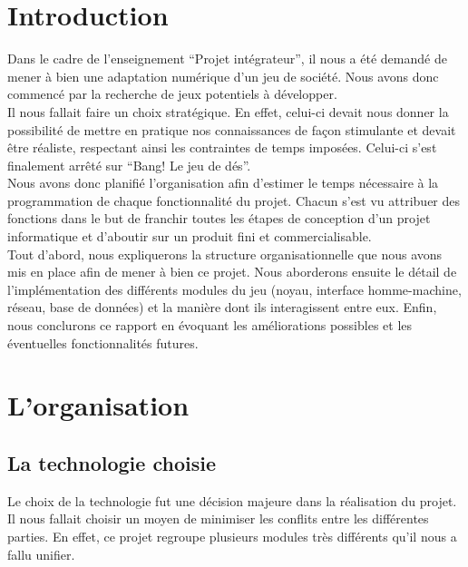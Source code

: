 \documentclass[a4paper,11pt]{article}
\begin{document}
\tableofcontents
\newpage


\section{Introduction}

Dans le cadre de l’enseignement “Projet intégrateur”, il nous a été demandé de mener à bien une adaptation numérique d’un jeu de société. Nous avons donc commencé par la recherche de jeux potentiels à développer. \\

Il nous fallait faire un choix stratégique. En effet, celui-ci devait nous donner la possibilité de mettre en pratique nos connaissances de façon stimulante et devait être réaliste, respectant ainsi les contraintes de temps imposées. Celui-ci s’est finalement arrêté sur “Bang! Le jeu de dés”. \\

Nous avons donc planifié l’organisation afin d’estimer le temps nécessaire à la programmation de chaque fonctionnalité du projet. Chacun s’est vu attribuer des fonctions dans le but de franchir toutes les étapes de conception d’un projet informatique et d’aboutir sur un produit fini et commercialisable. \\

 Tout d’abord, nous expliquerons la structure organisationnelle que nous avons mis en place afin de mener à bien ce projet. Nous aborderons ensuite le détail de l’implémentation des différents modules du jeu (noyau, interface homme-machine, réseau, base de données) et la manière dont ils interagissent entre eux. Enfin, nous conclurons ce rapport en évoquant les améliorations possibles et les éventuelles fonctionnalités futures. \\

\newpage

\section{L'organisation}

\subsection{La technologie choisie}

Le choix de la technologie fut une décision majeure dans la réalisation du projet. Il nous fallait choisir un moyen de minimiser les conflits entre les différentes parties. En effet, ce projet regroupe plusieurs modules très différents qu’il nous a fallu unifier. \\
\end{document}
